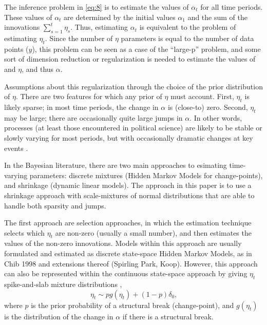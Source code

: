 \documentclass{article}
\begin{document}
The inference problem in \eqref{eq:8} is to estimate the values of $\alpha_{t}$ for all time periods.
These values of $\alpha_{t}$ are determined by the initial values $\alpha_{1}$ and the sum of the innovations $\sum_{s=1}^{t} \eta_{s}$.
Thus, estimating $\alpha_{t}$ is equivalent to the problem of estimating $\eta_{t}$.
Since the number of $\eta$ parameters is equal to the number of data points ($y$), this problem can be seen as a case of the ``large-p'' problem, and some sort of dimension reduction or regularization is needed to estimate the values of and $\eta$, and thus $\alpha$.

Assumptions about this regularization through the choice of the prior distribution of $\eta$.
There are two features for which any prior of $\eta$ must account.
First, $\eta_{t}$ is likely sparse; in most time periods, the change in $\alpha$ is (close-to) zero.
Second, $\eta_{t}$ may be large; there are occasionally quite large jumps in $\alpha$.
In other words, processes (at least those encountered in political science) are likely to be stable or slowly varying for most periods, but with occasionally dramatic changes at key events \parencite{RatkovicEng2010}.

In the Bayesian literature, there are two main approaches to esimating time-varying parameters: discrete mixtures (Hidden Markov Models for change-points), and shrinkage (dynamic linear models).
The approach in this paper is to use a shrinkage approach with scale-mixtures of normal distributions that are able to handle both sparsity and jumps.

The first approach are selection approaches, in which the estimation technique selects which $\eta_{t}$ are non-zero (usually a small number), and then estimates the values of the non-zero innovations.
Models within this approach are usually formulated and estimated as discrete state-space Hidden Markov Models, as in Chib 1998 and extensions thereof (Spirling Park, Koop).
However, this approach can also be represented within the continuous state-space approach by giving $\eta_{t}$ spike-and-slab mixture distributions \parencite{GiordaniKohn2008},
\begin{equation}
  \label{eq:1}
  \eta_{t} \sim p g(\eta_{t}) + (1 - p) \delta_{0} \text{,}
\end{equation}
where $p$ is the prior probability of a structural break (change-point), and $g(\eta_{t})$ is the distribution of the change in $\alpha$ if there is a structural break.
\end{document}
